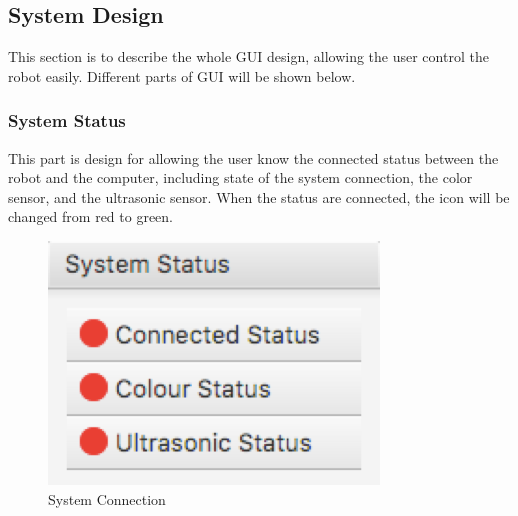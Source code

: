 \documentclass[10pt,a4paper,titlepage]{article}
\begin{document}
  \subsection{System Design} 
  This section is to describe the whole GUI design, allowing the user control the robot easily. Different parts of GUI will be shown below. 
  \subsubsection{System Status} 
  This part is design for allowing the user know the connected status between the robot and the computer, including state of the system connection, the color sensor, and the ultrasonic sensor. When the status are connected, the icon will be changed from red to green.   
  \begin{figure}[H] 
  \includegraphics[width=\linewidth]{systemconnect.png}  %
  \caption{System Connection} 
  \label{fig:System Connection}               
  \end{figure} 
   
\end{document}
